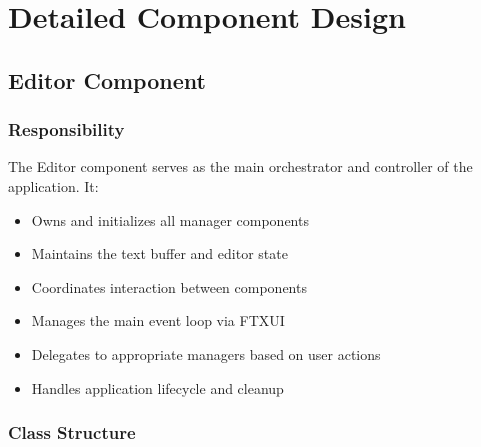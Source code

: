 \documentclass[12pt,a4paper,oneside,openany]{report}
\begin{document}
\chapter{Detailed Component Design}

\section{Editor Component}

\subsection{Responsibility}

The Editor component serves as the main orchestrator and controller of the application. It:

\begin{itemize}
	\item Owns and initializes all manager components
	\item Maintains the text buffer and editor state
	\item Coordinates interaction between components
	\item Manages the main event loop via FTXUI
	\item Delegates to appropriate managers based on user actions
	\item Handles application lifecycle and cleanup
\end{itemize}

\subsection{Class Structure}
\end{document}
